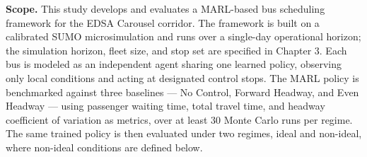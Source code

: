 \textbf{Scope.} This study develops and evaluates a MARL-based bus scheduling framework for the EDSA Carousel corridor. The framework is built on a calibrated SUMO microsimulation and runs over a single-day operational horizon; the simulation horizon, fleet size, and stop set are specified in Chapter 3. Each bus is modeled as an independent agent sharing one learned policy, observing only local conditions and acting at designated control stops. The MARL policy is benchmarked against three baselines — No Control, Forward Headway, and Even Headway — using passenger waiting time, total travel time, and headway coefficient of variation as metrics, over at least 30 Monte Carlo runs per regime. The same trained policy is then evaluated under two regimes, ideal and non-ideal, where non-ideal conditions are defined below.


